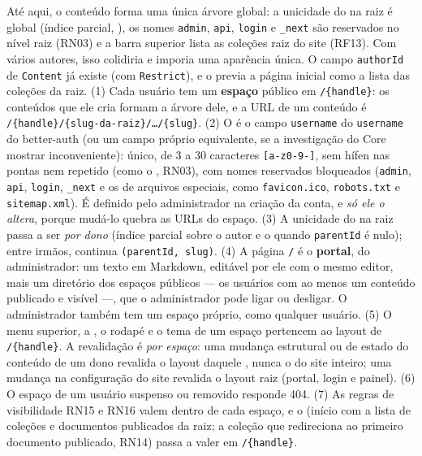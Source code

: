 {Até aqui, o conteúdo forma uma única árvore global: a unicidade do  na raiz é global (índice parcial, ), os nomes \texttt{admin}, \texttt{api}, \texttt{login} e \texttt{\_next} são reservados no nível raiz (RN03) e a barra superior lista as coleções raiz do site (RF13). Com vários autores, isso colidiria  e imporia uma aparência única. O campo \texttt{authorId} de \texttt{Content} já existe (com \texttt{Restrict}), e o  previa a página inicial como a lista das coleções da raiz.}
{(1) Cada usuário tem um \textbf{espaço} público em \texttt{/\{handle\}}: os conteúdos que ele cria formam a árvore dele, e a URL de um conteúdo é \texttt{/\{handle\}/\{slug-da-raiz\}/\ldots/\{slug\}}. (2) O  é o campo \texttt{username} do  \texttt{username} do better-auth (ou um campo próprio equivalente, se a investigação do Core mostrar inconveniente): único, de 3 a 30 caracteres \texttt{[a-z0-9-]}, sem hífen nas pontas nem repetido (como o , RN03), com nomes reservados bloqueados (\texttt{admin}, \texttt{api}, \texttt{login}, \texttt{\_next} e os de arquivos especiais, como \texttt{favicon.ico}, \texttt{robots.txt} e \texttt{sitemap.xml}). É definido pelo administrador na criação da conta, e \emph{só ele o altera}, porque mudá-lo quebra as URLs do espaço. (3) A unicidade do  na raiz passa a ser \emph{por dono} (índice parcial sobre o autor e o  quando \texttt{parentId} é nulo); entre irmãos, continua \texttt{(parentId, slug)}. (4) A página \texttt{/} é o \textbf{portal}, do administrador: um texto em Markdown, editável por ele com o mesmo editor, mais um diretório dos espaços públicos --- os usuários com ao menos um conteúdo publicado e visível ---, que o administrador pode ligar ou desligar. O administrador também tem um espaço próprio, como qualquer usuário. (5) O menu superior, a , o rodapé e o tema de um espaço pertencem ao layout de \texttt{/\{handle\}}. A revalidação é \emph{por espaço}: uma mudança estrutural ou de estado do conteúdo de um dono revalida o layout daquele , nunca o do site inteiro; uma mudança na configuração do site revalida o layout raiz (portal, login e painel). (6) O espaço de um usuário suspenso ou removido responde 404. (7) As regras de visibilidade RN15 e RN16 valem dentro de cada espaço, e o  (início com a lista de coleções e documentos publicados da raiz; a coleção que redireciona ao primeiro documento publicado, RN14) passa a valer em \texttt{/\{handle\}}.}
